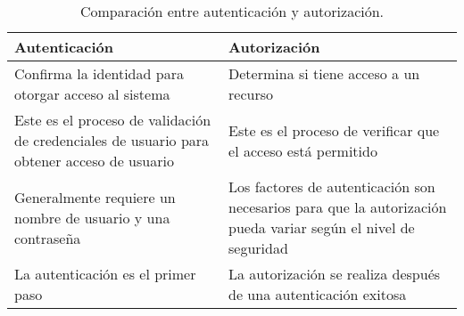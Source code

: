 \begin{table}[H]

\centering
\begin{tabular}{ |p{4cm}| p{4cm} | }
	\hline
	 \textbf{Autenticación}&\textbf{Autorización}\\
	\hline
	Confirma la identidad para otorgar acceso al sistema & Determina si tiene acceso a un recurso\\
	\hline
	Este es el proceso de validación de credenciales de usuario para obtener acceso de usuario&Este es el proceso de verificar que el acceso está permitido\\
	\hline
	Generalmente requiere un nombre de usuario y una contraseña& Los factores de autenticación son necesarios para que la autorización pueda variar según el nivel de seguridad\\
	\hline
	La autenticación es el primer paso & La autorización se realiza después de una autenticación exitosa\\
	\hline
\end{tabular}
\caption{\label{tab:table-name}Comparación entre autenticación y autorización.}
\end{table}